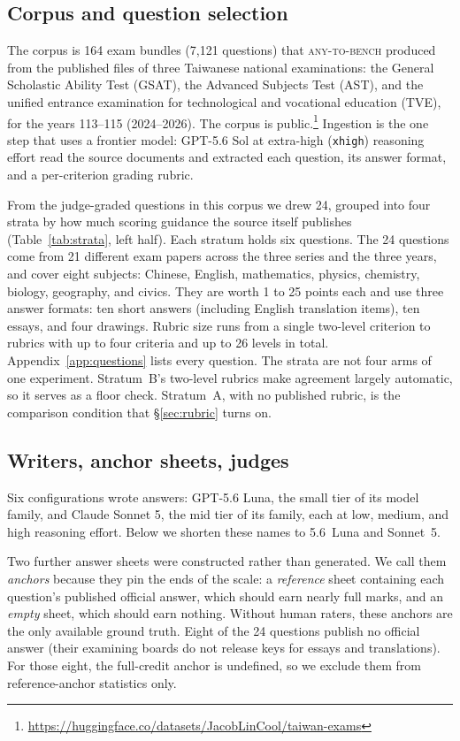 \documentclass{article}
\begin{document}
\subsection{Corpus and question selection}

The corpus is 164 exam bundles (7{,}121 questions) that \textsc{any-to-bench}
produced from the published files of three Taiwanese national examinations:
the General Scholastic Ability Test (GSAT), the Advanced Subjects Test (AST),
and the unified entrance examination for technological and vocational
education (TVE), for the years 113--115 (2024--2026). The corpus is
public.\footnote{\url{https://huggingface.co/datasets/JacobLinCool/taiwan-exams}}
Ingestion is the one step that uses a frontier model: GPT-5.6 Sol at
extra-high (\texttt{xhigh}) reasoning effort read the source documents and
extracted each question, its answer format, and a per-criterion grading
rubric.

From the judge-graded questions in this corpus we drew 24, grouped into four
strata by how much scoring guidance the source itself publishes
(Table~\ref{tab:strata}, left half). Each stratum holds six questions. The 24
questions come from 21 different exam papers across the three series and the
three years, and cover eight subjects: Chinese, English, mathematics,
physics, chemistry, biology, geography, and civics. They are worth 1 to 25
points each and use three answer formats: ten short answers (including
English translation items), ten essays, and four drawings. Rubric size runs
from a single two-level criterion to rubrics with up to four criteria and up
to 26 levels in total. Appendix~\ref{app:questions} lists every question. The strata are not four arms of one experiment.
Stratum~B's two-level rubrics make agreement largely automatic, so it serves
as a floor check. Stratum~A, with no published rubric, is the comparison
condition that \S\ref{sec:rubric} turns on.

\subsection{Writers, anchor sheets, judges}

Six configurations wrote answers: GPT-5.6 Luna, the small tier of its model
family, and Claude Sonnet 5, the mid tier of its family, each at low, medium,
and high reasoning effort. Below we shorten these names to 5.6~Luna and
Sonnet~5.

Two further answer sheets were constructed rather than generated. We call them
\emph{anchors} because they pin the ends of the scale: a \emph{reference}
sheet containing each question's published official answer, which should earn
nearly full marks, and an \emph{empty} sheet, which should earn nothing.
Without human raters, these anchors are the only available ground truth. Eight
of the 24 questions publish no official answer (their examining boards do not
release keys for essays and translations). For those eight, the full-credit
anchor is undefined, so we exclude them from reference-anchor statistics only.
\end{document}

